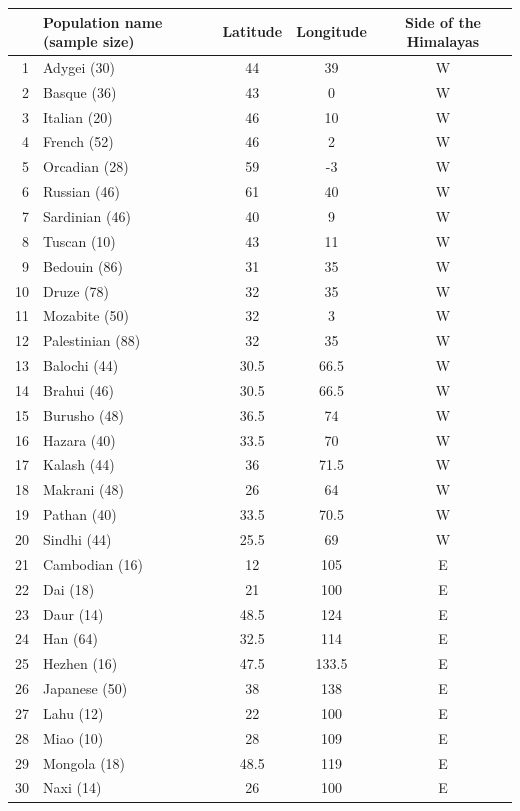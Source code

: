 \begin{table}
\begin{center}
\tiny{
    \begin{tabular}{r@{--}lccc}
  \hline
  & Population name (sample size) & Latitude & Longitude & Side of the Himalayas \\ 
  \hline
1 & Adygei (30) & 44 & 39 & W \\ 
2 & Basque (36) & 43 & 0 & W \\ 
3 & Italian (20) & 46 & 10 & W \\ 
4 & French (52) & 46 & 2 & W \\ 
5 & Orcadian (28) & 59 & -3 & W \\ 
6 & Russian (46) & 61 & 40 & W \\ 
7 & Sardinian (46) & 40 & 9 & W \\ 
8 & Tuscan (10) & 43 & 11 & W \\ 
9 & Bedouin (86) & 31 & 35 & W \\ 
10 & Druze (78) & 32 & 35 & W \\ 
11 & Mozabite (50) & 32 & 3 & W \\ 
12 & Palestinian (88) & 32 & 35 & W \\ 
13 & Balochi (44) & 30.5 & 66.5 & W \\ 
14 & Brahui (46) & 30.5 & 66.5 & W \\ 
15 & Burusho (48) & 36.5 & 74 & W \\ 
16 & Hazara (40) & 33.5 & 70 & W \\ 
17 & Kalash (44) & 36 & 71.5 & W \\ 
18 & Makrani (48) & 26 & 64 & W \\ 
19 & Pathan (40) & 33.5 & 70.5 & W \\ 
20 & Sindhi (44) & 25.5 & 69 & W \\ 
21 & Cambodian (16) & 12 & 105 & E \\ 
22 & Dai (18) & 21 & 100 & E \\ 
23 & Daur (14) & 48.5 & 124 & E \\ 
24 & Han (64) & 32.5 & 114 & E \\ 
25 & Hezhen (16) & 47.5 & 133.5 & E \\ 
26 & Japanese (50) & 38 & 138 & E \\ 
27 & Lahu (12) & 22 & 100 & E \\ 
28 & Miao (10) & 28 & 109 & E \\ 
29 & Mongola (18) & 48.5 & 119 & E \\ 
30 & Naxi (14) & 26 & 100 & E \\ 

\end{tabular}}
\end{center}
\end{table}

